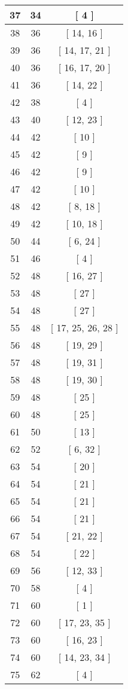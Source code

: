 \begin{center}
\begin{longtable}[H]{|| c c c ||}
37 & 34 & [ 4 ]
\\\hline
38 & 36 & [ 14, 16 ]
\\\hline
39 & 36 & [ 14, 17, 21 ]
\\\hline
40 & 36 & [ 16, 17, 20 ]
\\\hline
41 & 36 & [ 14, 22 ]
\\\hline
42 & 38 & [ 4 ]
\\\hline
43 & 40 & [ 12, 23 ]
\\\hline
44 & 42 & [ 10 ]
\\\hline
45 & 42 & [ 9 ]
\\\hline
46 & 42 & [ 9 ]
\\\hline
47 & 42 & [ 10 ]
\\\hline
48 & 42 & [ 8, 18 ]
\\\hline
49 & 42 & [ 10, 18 ]
\\\hline
50 & 44 & [ 6, 24 ]
\\\hline
51 & 46 & [ 4 ]
\\\hline
52 & 48 & [ 16, 27 ]
\\\hline
53 & 48 & [ 27 ]
\\\hline
54 & 48 & [ 27 ]
\\\hline
55 & 48 & [ 17, 25, 26, 28 ]
\\\hline
56 & 48 & [ 19, 29 ]
\\\hline
57 & 48 & [ 19, 31 ]
\\\hline
58 & 48 & [ 19, 30 ]
\\\hline
59 & 48 & [ 25 ]
\\\hline
60 & 48 & [ 25 ]
\\\hline
61 & 50 & [ 13 ]
\\\hline
62 & 52 & [ 6, 32 ]
\\\hline
63 & 54 & [ 20 ]
\\\hline
64 & 54 & [ 21 ]
\\\hline
65 & 54 & [ 21 ]
\\\hline
66 & 54 & [ 21 ]
\\\hline
67 & 54 & [ 21, 22 ]
\\\hline
68 & 54 & [ 22 ]
\\\hline
69 & 56 & [ 12, 33 ]
\\\hline
70 & 58 & [ 4 ]
\\\hline
71 & 60 & [ 1 ]
\\\hline
72 & 60 & [ 17, 23, 35 ]
\\\hline
73 & 60 & [ 16, 23 ]
\\\hline
74 & 60 & [ 14, 23, 34 ]
\\\hline
75 & 62 & [ 4 ]

\end{longtable}
\end{center}
